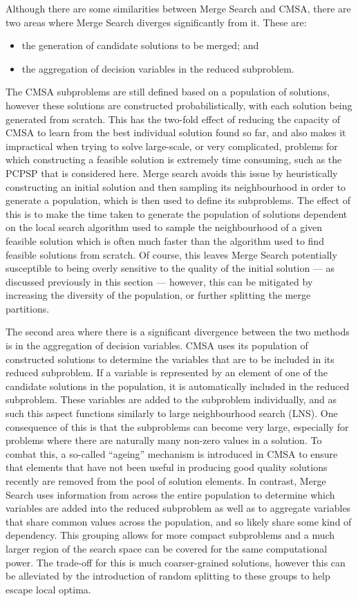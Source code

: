 \documentclass[journal]{IEEEtran}
\begin{document}
Although there are some similarities between Merge Search and CMSA, there are two areas where Merge Search diverges significantly from it. These are:
\begin{itemize}
\item the generation of candidate solutions to be merged; and
\item the aggregation of decision variables in the reduced subproblem.
\end{itemize}
The CMSA subproblems are still defined based on a population of solutions, however these solutions are constructed probabilistically, with each solution being generated from scratch. This has the two-fold effect of reducing the capacity of CMSA to learn from the best individual solution found so far, and also makes it impractical when trying to solve large-scale, or very complicated, problems for which constructing a feasible solution is extremely time consuming, such as the PCPSP that is considered here. Merge search avoids this issue by heuristically constructing an initial solution and then sampling its neighbourhood in order to generate a population, which is then used to define its subproblems. The effect of this is to make the time taken to generate the population of solutions dependent on the local search algorithm used to sample the neighbourhood of a given feasible solution which is often much faster than the algorithm used to find feasible solutions from scratch. Of course, this leaves Merge Search potentially susceptible to being overly sensitive to the quality of the initial solution --- as discussed previously in this section --- however, this can be mitigated by increasing the diversity of the population, or further splitting the merge partitions. 

The second area where there is a significant divergence between the two methods is in the aggregation of decision variables. CMSA uses its population of constructed solutions to determine the variables that are to be included in its reduced subproblem. If a variable is represented by an element of one of the candidate solutions in the population, it is automatically included in the reduced subproblem. These variables are added to the subproblem individually, and as such this aspect functions similarly to large neighbourhood search (LNS). One consequence of this is that the subproblems can become very large, especially for problems where there are naturally many non-zero values in a solution. To combat this, a so-called ``ageing'' mechanism is introduced in CMSA to ensure that elements that have not been useful in producing good quality solutions recently are removed from the pool of solution elements. In contrast, Merge Search uses information from across the entire population to determine which variables are added into the reduced subproblem as well as to aggregate variables that share common values across the population, and so likely share some kind of dependency. This grouping allows for more compact subproblems and a much larger region of the search space can be covered for the same computational power. The trade-off for this is much coarser-grained solutions, however this can be alleviated by the introduction of random splitting to these groups to help escape local optima.
\end{document}
